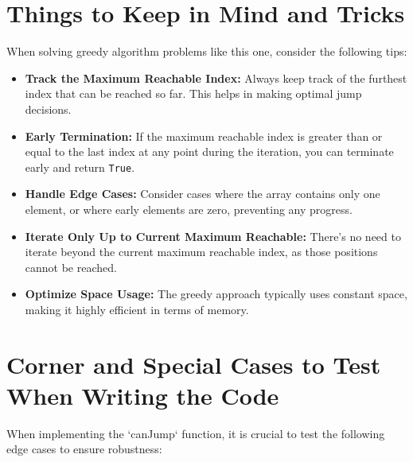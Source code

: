 \section*{Things to Keep in Mind and Tricks}

When solving greedy algorithm problems like this one, consider the following tips:

\begin{itemize}
    \item \textbf{Track the Maximum Reachable Index:} Always keep track of the furthest index that can be reached so far. This helps in making optimal jump decisions.
    
    \item \textbf{Early Termination:} If the maximum reachable index is greater than or equal to the last index at any point during the iteration, you can terminate early and return \texttt{True}.
    
    \item \textbf{Handle Edge Cases:} Consider cases where the array contains only one element, or where early elements are zero, preventing any progress.
    
    \item \textbf{Iterate Only Up to Current Maximum Reachable:} There's no need to iterate beyond the current maximum reachable index, as those positions cannot be reached.
    
    \item \textbf{Optimize Space Usage:} The greedy approach typically uses constant space, making it highly efficient in terms of memory.
\end{itemize}

\section*{Corner and Special Cases to Test When Writing the Code}

When implementing the `canJump` function, it is crucial to test the following edge cases to ensure robustness:

